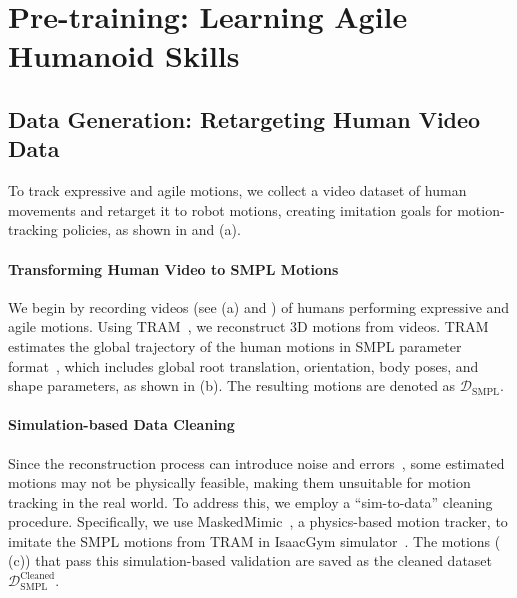 





\section{Pre-training: Learning Agile Humanoid Skills}
\label{sec:deepmimic}

\subsection{Data Generation: Retargeting Human Video Data}
To track expressive and agile motions, we collect a video dataset of human movements and retarget it to robot motions, creating imitation goals for motion-tracking policies, as shown in  and  (a).

\paragraph{Transforming Human Video to SMPL Motions}

We begin by recording videos (see  (a) and ) of humans performing expressive and agile motions. Using TRAM~\cite{wang2025tram}, we reconstruct 3D motions from videos. TRAM estimates the global trajectory of the human motions in SMPL parameter format~\cite{loper2023smpl}, which includes global root translation, orientation, body poses, and shape parameters, as shown in  (b). The resulting motions are denoted as ${\mathcal{D}}_{\text{SMPL}}$. 





\paragraph{Simulation-based Data Cleaning}

Since the reconstruction process can introduce noise and errors~\cite{he2024learning}, some estimated motions may not be physically feasible, making them unsuitable for motion tracking in the real world. To address this, we employ a ``sim-to-data'' cleaning procedure. Specifically, we use MaskedMimic~\cite{tessler2024maskedmimic}, a physics-based motion tracker, to imitate the SMPL motions from TRAM in IsaacGym simulator~\cite{makoviychuk2021isaac}. The motions ( (c)) that pass this simulation-based validation are saved as the cleaned dataset ${\mathcal{D}}_{\text{SMPL}}^{\text{Cleaned}}$.

